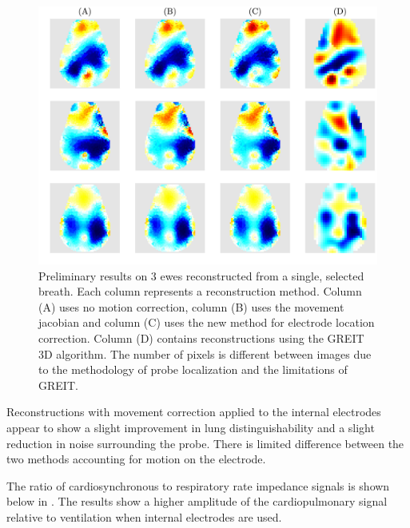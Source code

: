 \begin{figure}[H]
    \centering
	\includegraphics[width=\textwidth]{chapter7-internal_elec_motion/imgs/lamb_reconstruction_all.pdf} 
	\caption[Reconstrions on 3 ewes]{\label{fig:internal_reconstructions} 
	Preliminary results on 3 ewes reconstructed 
	from a single, selected breath. Each column represents a reconstruction method. Column (A)
	uses no motion correction, column (B) uses the movement jacobian and column (C) uses the new method
	for electrode location correction. Column (D) contains reconstructions using the GREIT 3D algorithm.
	The number of pixels is different between images due to the methodology of probe localization and 
	the limitations of GREIT.}
\end{figure}

Reconstructions with movement correction applied to the internal electrodes appear to show a 
slight improvement in lung distinguishability and a slight reduction
in noise surrounding the probe. There is limited difference between the
two methods accounting for motion on the electrode.

The ratio of cardiosynchronous to respiratory rate impedance signals is shown below in 
. The results show a higher amplitude of the cardiopulmonary 
signal relative to ventilation when internal electrodes are used.

